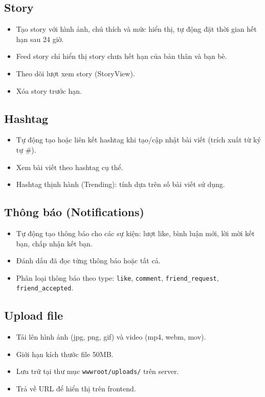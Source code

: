 \documentclass[a4paper]{article}
\begin{document}
\subsection{Story}

\begin{itemize}
    \item Tạo story với hình ảnh, chú thích và mức hiển thị, tự động đặt thời gian hết hạn sau 24 giờ.
    \item Feed story chỉ hiển thị story chưa hết hạn của bản thân và bạn bè.
    \item Theo dõi lượt xem story (StoryView).
    \item Xóa story trước hạn.
\end{itemize}

\subsection{Hashtag}

\begin{itemize}
    \item Tự động tạo hoặc liên kết hashtag khi tạo/cập nhật bài viết (trích xuất từ ký tự \#).
    \item Xem bài viết theo hashtag cụ thể.
    \item Hashtag thịnh hành (Trending): tính dựa trên số bài viết sử dụng.
\end{itemize}

\subsection{Thông báo (Notifications)}

\begin{itemize}
    \item Tự động tạo thông báo cho các sự kiện: lượt like, bình luận mới, lời mời kết bạn, chấp nhận kết bạn.
    \item Đánh dấu đã đọc từng thông báo hoặc tất cả.
    \item Phân loại thông báo theo type: \texttt{like}, \texttt{comment}, \texttt{friend\_request}, \texttt{friend\_accepted}.
\end{itemize}

\subsection{Upload file}

\begin{itemize}
    \item Tải lên hình ảnh (jpg, png, gif) và video (mp4, webm, mov).
    \item Giới hạn kích thước file 50MB.
    \item Lưu trữ tại thư mục \texttt{wwwroot/uploads/} trên server.
    \item Trả về URL để hiển thị trên frontend.
\end{itemize}
\end{document}
